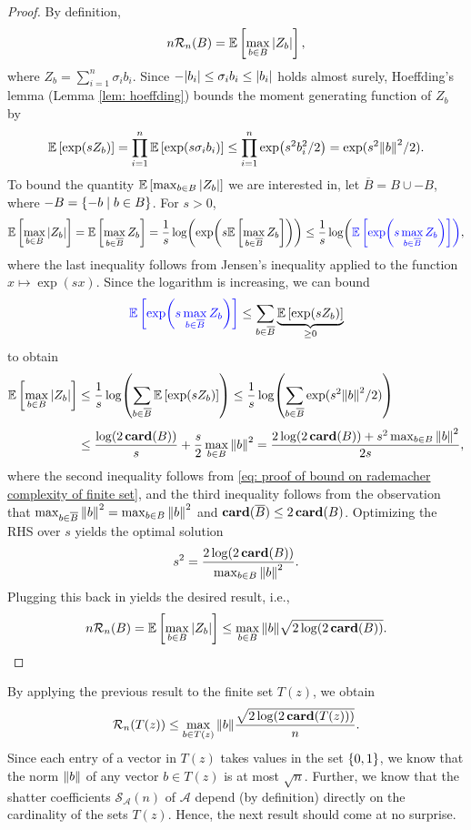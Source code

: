 \begin{proof}
By definition,
\[
    n \mathcal{R}_n(B) = \mathbb{E}\left[ \max_{b \in B} \abs{Z_b} \right],
\]
where $Z_b = \sum_{i=1}^n \sigma_i b_i$. Since $-\abs{b_i} \leq \sigma_i b_i \leq \abs{b_i}$ holds almost surely, Hoeffding's lemma (Lemma \ref{lem: hoeffding}) bounds the moment generating function of $Z_b$ by
\begin{equation}
\label{eq: proof of bound on rademacher complexity of finite set}
    \mathbb{E}\left[\exp(s Z_b)\right] = \prod_{i=1}^n \mathbb{E}\left[\exp(s \sigma_i b_i)\right] \leq \prod_{i=1}^n \exp(s^2 b_i^2 / 2) = \mathrm{exp}(s^2 \norm{b}^2 / 2).
\end{equation}
To bound the quantity $\mathbb{E}\left[\max_{b \in B} \abs{Z_b}\right]$ we are interested in, let $\overline{B} = B \cup -B$, where $-B = \left\{-b \mathrel{|} b \in B\right\}$. For $s>0$,
\[
    \mathbb{E}\left[\max_{b \in B} \abs{Z_b}\right] = \mathbb{E}\left[\max_{b \in \overline{B}} Z_b\right] = \frac{1}{s} \log( \exp( s \mathbb{E}\left[\max_{b \in \overline{B}} Z_b\right] )) \leq \frac{1}{s} \log({\color{blue} \mathbb{E}\left[ \exp( s \max_{b \in \overline{B}} Z_b )\right] }),
\]
where the last inequality follows from Jensen's inequality applied to the function $x \mapsto \exp(sx)$. Since the logarithm is increasing, we can bound
\[
    {\color{blue} \mathbb{E}\left[ \exp( s \max_{b \in \overline{B}} Z_b )\right] } \leq \sum_{b \in \overline{B}} \underbrace{\mathbb{E}\left[\exp(s Z_b)\right]}_{\geq 0}
\]
to obtain
\begin{align*}
    \mathbb{E}\left[\max_{b \in B} \abs{Z_b}\right] &\leq \frac{1}{s} \log( \sum_{b \in \overline{B}} \mathbb{E}\left[\exp(s Z_b)\right] ) \leq \frac{1}{s} \log( \sum_{b \in \overline{B}} \mathrm{exp}(s^2 \norm{b}^2 / 2) ) \\[4pt]
        &\leq \frac{\log(2 \, \mathrm{\mathbf{card}}(B))}{s} + \frac{s}{2} \max_{b \in B} \norm{b}^2 = \frac{2 \log(2 \, \mathrm{\mathbf{card}}(B)) + s^2 \max_{b \in B} \norm{b}^2}{2s},
\end{align*}
where the second inequality follows from \eqref{eq: proof of bound on rademacher complexity of finite set}, and the third inequality follows from the observation that $\max_{b \in \overline{B}} \norm{b}^2 = \max_{b \in B} \norm{b}^2$ and $\mathrm{\mathbf{card}}(\overline{B}) \leq 2 \, \mathrm{\mathbf{card}}(B)$. Optimizing the RHS over $s$ yields the optimal solution
\[
    s^2 = \frac{2 \log(2 \, \mathrm{\mathbf{card}}(B))}{\max_{b \in B} \norm{b}^2}.
\]
Plugging this back in yields the desired result, i.e.,
\[
    n \mathcal{R}_n(B) = \mathbb{E}\left[ \max_{b \in B} \abs{Z_b} \right] \leq \max_{b \in B} \norm{b} \sqrt{2 \log(2 \, \mathrm{\mathbf{card}}(B))}.
\]
\end{proof}

By applying the previous result to the finite set $T(z)$, we obtain
\[
    \mathcal{R}_n(T(z)) \leq \max_{b \in T(z)} \norm{b} \frac{\sqrt{2 \log(2 \, \mathrm{\mathbf{card}}(T(z)))}}{n}.
\]
Since each entry of a vector in $T(z)$ takes values in the set $\left\{0, 1\right\}$, we know that the norm $\norm{b}$ of any vector $b \in T(z)$ is at most $\sqrt{n}$. Further, we know that the shatter coefficients $\mathcal{S}_{\mathcal{A}}(n)$ of $\mathcal{A}$ depend (by definition) directly on the cardinality of the sets $T(z)$. Hence, the next result should come at no surprise.

